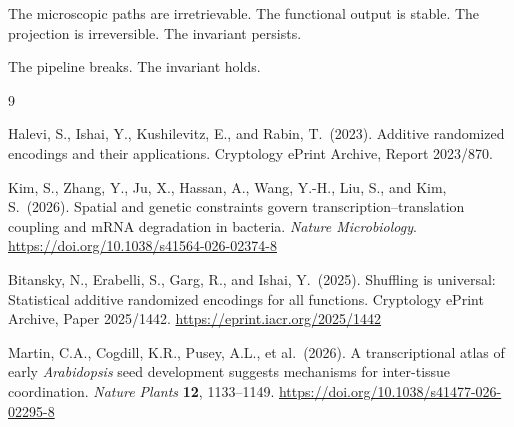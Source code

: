 \documentclass[12pt, a4paper]{article}
\theoremstyle{essaystyle}
\begin{document}
The microscopic paths are irretrievable. The functional output is stable. The projection
is irreversible. The invariant persists.

The pipeline breaks. The invariant holds.

\newpage

\begin{thebibliography}{9}

Halevi, S., Ishai, Y., Kushilevitz, E., and Rabin, T.\ (2023).
Additive randomized encodings and their applications.
Cryptology ePrint Archive, Report 2023/870.

Kim, S., Zhang, Y., Ju, X., Hassan, A., Wang, Y.-H., Liu, S., and Kim, S.\ (2026).
Spatial and genetic constraints govern transcription--translation coupling
and mRNA degradation in bacteria.
\textit{Nature Microbiology}.
\url{https://doi.org/10.1038/s41564-026-02374-8}

Bitansky, N., Erabelli, S., Garg, R., and Ishai, Y.\ (2025).
Shuffling is universal: Statistical additive randomized encodings for all functions.
Cryptology ePrint Archive, Paper 2025/1442.
\url{https://eprint.iacr.org/2025/1442}

Martin, C.A., Cogdill, K.R., Pusey, A.L., et al.\ (2026).
A transcriptional atlas of early \textit{Arabidopsis} seed development suggests
mechanisms for inter-tissue coordination.
\textit{Nature Plants} \textbf{12}, 1133--1149.
\url{https://doi.org/10.1038/s41477-026-02295-8}

\end{thebibliography}
\end{document}
